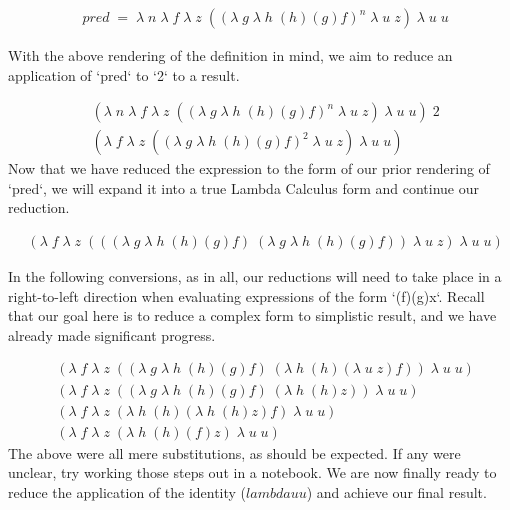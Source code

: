 \begin{align*}
& pred \; = \; \lambda \; n \; \lambda \; f \; \lambda \; z \; ((\lambda \; g \; \lambda \; h \; (h)(g)f)^{n} \; \lambda \; u \; z) \; \lambda \; u \; u
\end{align*}

With the above rendering of the definition in mind, we aim to reduce an
application of `pred` to `2` to a result.

\begin{align*}
& (\lambda \; n \; \lambda \; f \; \lambda \; z \; ((\lambda \; g \; \lambda \; h \; (h)(g)f)^{n} \; \lambda \; u \; z) \; \lambda \; u \; u) \; 2
\\& (\lambda \; f \; \lambda \; z \; ((\lambda \; g \; \lambda \; h \; (h)(g)f)^2 \; \lambda \; u \; z) \; \lambda \; u \; u)
\end{align*}
Now that we have reduced the expression to the form of our prior rendering of
`pred`, we will expand it into a true Lambda Calculus form and continue our
reduction.

\begin{align*}
& (\lambda \; f \; \lambda \; z \; (((\lambda \; g \; \lambda \; h \; (h)(g)f) \; (\lambda \; g \; \lambda \; h \; (h)(g)f)) \; \lambda \; u \; z) \; \lambda \; u \; u)
\end{align*}

In the following conversions, as in all, our reductions will need to take place in 
a right-to-left direction when evaluating expressions of the form `(f)(g)x`.
Recall that our goal here is to reduce a complex form to simplistic result, and we 
have already made significant progress.

\begin{align*}
& (\lambda \; f \; \lambda \; z \; ((\lambda \; g \; \lambda \; h \; (h)(g)f) \; (\lambda \; h \; (h)(\lambda \; u \; z)f)) \; \lambda \; u \; u)
\\& (\lambda \; f \; \lambda \; z \; ((\lambda \; g \; \lambda \; h \; (h)(g)f) \; (\lambda \; h \; (h)z)) \; \lambda \; u \; u)
\\& (\lambda \; f \; \lambda \; z \; (\lambda \; h \; (h)(\lambda \; h \; (h)z)f) \; \lambda \; u \; u)
\\& (\lambda \; f \; \lambda \; z \; (\lambda \; h \; (h)(f)z) \; \lambda \; u \; u)
\end{align*}
The above were all mere substitutions, as should be expected. If any were unclear, 
try working those steps out in a notebook. We are now finally ready to reduce the
application of the identity ($lambda u u$) and achieve our final result.

